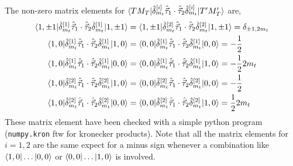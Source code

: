 \documentclass[10pt]{article}
\begin{document}
The non-zero matrix elements for $ \braket{ T M_T |  \hat{\delta}_{m_t}^{[i]} \hat{\vec{\tau}}_{1} \cdot \hat{\vec{\tau}}_{2} \hat{\delta}_{m_t}^{[i]} | T' M_T'}$ are,
\begin{align*}
	\braket{ 1, \pm 1 | \hat{\delta}_{m_t}^{[1]} \hat{\vec{\tau}}_{1} \cdot \hat{\vec{\tau}}_{2} \hat{\delta}_{m_t}^{[1]} | 1, \pm 1} &= \braket{ 1, \pm 1 | \hat{\delta}_{m_t}^{[2]} \hat{\vec{\tau}}_{1} \cdot \hat{\vec{\tau}}_{2} \hat{\delta}_{m_t}^{[2]} | 1, \pm 1} = \delta_{ \pm 1,2m_t}  \\
	\braket{ 1,0 | \hat{\delta}_{m_t}^{[1]} \hat{\vec{\tau}}_{1} \cdot \hat{\vec{\tau}}_{2} \hat{\delta}_{m_t}^{[1]} | 1,0} &= \braket{ 0,0 | \hat{\delta}_{m_t}^{[1]} \hat{\vec{\tau}}_{1} \cdot \hat{\vec{\tau}}_{2} \hat{\delta}_{m_t}^{[1]}| 0,0} = -\frac{1}{2} \\
	\braket{ 1,0 | \hat{\delta}_{m_t}^{[1]} \hat{\vec{\tau}}_{1} \cdot \hat{\vec{\tau}}_{2} \hat{\delta}_{m_t}^{[1]} | 0,0} &= \braket{ 0,0 | \hat{\delta}_{m_t}^{[1]} \hat{\vec{\tau}}_{1} \cdot \hat{\vec{\tau}}_{2} \hat{\delta}_{m_t}^{[1]}| 1,0}=-\frac{1}{2} 2m_t \\
		\braket{ 1,0 | \hat{\delta}_{m_t}^{[2]} \hat{\vec{\tau}}_{1} \cdot \hat{\vec{\tau}}_{2} \hat{\delta}_{m_t}^{[2]} | 1,0} &= \braket{ 0,0 | \hat{\delta}_{m_t}^{[2]} \hat{\vec{\tau}}_{1} \cdot \hat{\vec{\tau}}_{2} \hat{\delta}_{m_t}^{[2]}| 0,0} = -\frac{1}{2} \\
	\braket{ 1,0 | \hat{\delta}_{m_t}^{[2]} \hat{\vec{\tau}}_{1} \cdot \hat{\vec{\tau}}_{2} \hat{\delta}_{m_t}^{[2]} | 0,0} &= \braket{ 0,0 | \hat{\delta}_{m_t}^{[2]} \hat{\vec{\tau}}_{1} \cdot \hat{\vec{\tau}}_{2} \hat{\delta}_{m_t}^{[2]}| 1,0}=\frac{1}{2} 2m_t
\end{align*}
These matrix element have been checked with a simple python program (\texttt{numpy.kron} ftw for kronecker products). Note that all the matrix elements for $i=1,2$ are the same expect for a minus sign whenever a combination like $ \braket{ 1,0 | \ldots | 0,0}$ or $\braket{0,0| \ldots | 1,0}$ is involved.
\end{document}
